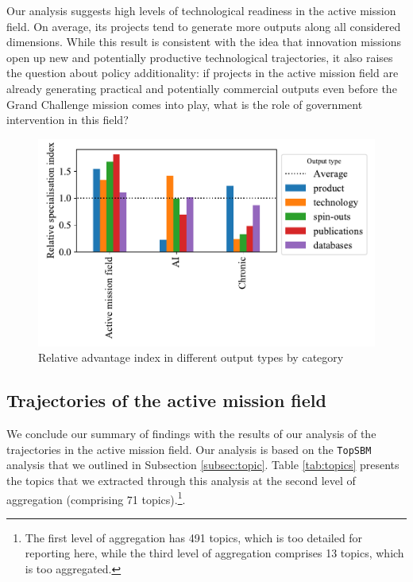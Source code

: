 \documentclass[11pt]{article}
\begin{document}
Our analysis suggests high levels of technological readiness in the active mission field. On average, its projects tend to generate more outputs along all considered dimensions. While this result is consistent with the idea that innovation missions  open up new and potentially productive technological trajectories, it also raises the question about policy additionality: if projects in the active mission field are already generating practical and potentially commercial outputs even before the Grand Challenge mission comes into play, what is the role of government intervention in this field?

\begin{figure}[!ht]
    \centering
    \includegraphics[width=\textwidth]{figures/fig_17_outputs.pdf}
    \caption{Relative advantage index in different output types by category}
    \label{fig:outputs}
\end{figure}

\subsection{Trajectories of the active mission field}
\label{subsec:trajectory}

We conclude our summary of findings with the results of our analysis of the trajectories in the active mission field.  Our analysis is based on the \texttt{TopSBM} analysis that we outlined in Subsection \ref{subsec:topic}. Table \ref{tab:topics} presents the topics that we extracted through this analysis at the second level of aggregation (comprising 71 topics).\footnote{The first level of aggregation has 491 topics, which is too detailed for reporting here, while the third level of aggregation comprises 13 topics, which is too aggregated.}. 
\end{document}
